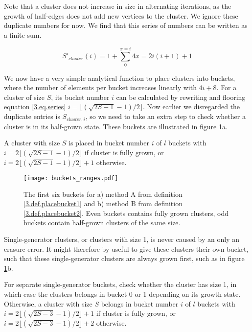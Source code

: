 Note that a cluster does not increase in size in alternating iterations, as the growth of half-edges does not add new vertices to the cluster. We ignore these duplicate numbers for now. We find that this series of numbers can be written as a finite sum.

\begin{equation}\label{3.eq.series}
  S'_{cluster}(i) = 1 + \sum_{0}^{x=i} 4x = 2i(i+1) + 1
\end{equation}

We now have a very simple analytical function to place clusters into buckets, where the number of elements per bucket increases linearly with $4i + 8$. For a cluster of size $S$, its bucket number $i$ can be calculated by rewriting and flooring equation \ref{3.eq.series} $i=\lfloor (\sqrt{2S-1} - 1)/2 \rfloor$. Now earlier we disregarded the duplicate entries is $S_{cluster, i}$, so we need to take an extra step to check whether a cluster is in its half-grown state. These buckets are illustrated in figure \ref{3.fig.bucketsranges}a.

\begin{definition}\label{3.def.placebucket1}
  A cluster with size $S$ is placed in bucket number $i$ of $l$ buckets with $i=2\lfloor (\sqrt{2S-1} - 1)/2 \rfloor$ if cluster is fully grown, or $i=2\lfloor (\sqrt{2S-1} - 1)/2 \rfloor + 1$ otherwise.
\end{definition}

\begin{figure}[h]
  \centering
  \texttt{[image: buckets\_ranges.pdf]}
  \caption{The first six buckets for a) method A from definition \ref{3.def.placebucket1} and b) method B from definition \ref{3.def.placebucket2}. Even buckets contains fully grown clusters, odd buckets contain half-grown clusters of the same size.}\label{3.fig.bucketsranges}
\end{figure}

Single-generator clusters, or clusters with size 1, is never caused by an only an erasure error. It might therefore by useful to give these clusters their own bucket, such that these single-generator clusters are always grown first, such as in figure \ref{3.fig.bucketsranges}b.

\begin{definition}\label{3.def.placebucket2}
  For separate single-generator buckets, check whether the cluster has size 1, in which case the clusters belongs in bucket 0 or 1 depending on its growth state. Otherwise, a cluster with size $S$ belongs in bucket number $i$ of $l$ buckets with $i=2\lfloor (\sqrt{2S-3} - 1)/2 \rfloor + 1$ if cluster is fully grown, or $i=2\lfloor (\sqrt{2S-3} - 1)/2 \rfloor + 2$ otherwise.
\end{definition}

